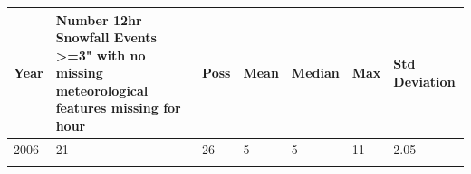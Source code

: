 \documentclass[11pt]{article}
\begin{document}
\begin{longtable}[]{@{}lllllll@{}}
\toprule
\begin{minipage}[b]{0.07\columnwidth}\raggedright\strut
Year\strut
\end{minipage} & \begin{minipage}[b]{0.34\columnwidth}\raggedright\strut
Number 12hr Snowfall Events \textgreater{}=3" with no missing
meteorological features missing for hour\strut
\end{minipage} & \begin{minipage}[b]{0.07\columnwidth}\raggedright\strut
Poss\strut
\end{minipage} & \begin{minipage}[b]{0.07\columnwidth}\raggedright\strut
Mean\strut
\end{minipage} & \begin{minipage}[b]{0.08\columnwidth}\raggedright\strut
Median\strut
\end{minipage} & \begin{minipage}[b]{0.06\columnwidth}\raggedright\strut
Max\strut
\end{minipage} & \begin{minipage}[b]{0.13\columnwidth}\raggedright\strut
Std Deviation\strut
\end{minipage}\tabularnewline
\midrule
\endhead
\begin{minipage}[t]{0.07\columnwidth}\raggedright\strut
2006\strut
\end{minipage} & \begin{minipage}[t]{0.34\columnwidth}\raggedright\strut
21\strut
\end{minipage} & \begin{minipage}[t]{0.07\columnwidth}\raggedright\strut
26\strut
\end{minipage} & \begin{minipage}[t]{0.07\columnwidth}\raggedright\strut
5\strut
\end{minipage} & \begin{minipage}[t]{0.08\columnwidth}\raggedright\strut
5\strut
\end{minipage} & \begin{minipage}[t]{0.06\columnwidth}\raggedright\strut
11\strut
\end{minipage} & \begin{minipage}[t]{0.13\columnwidth}\raggedright\strut
2.05\strut
\end{minipage}\tabularnewline
\begin{minipage}[t]{0.07\columnwidth}\raggedright\strut

\end{minipage}
\end{longtable}
\end{document}
